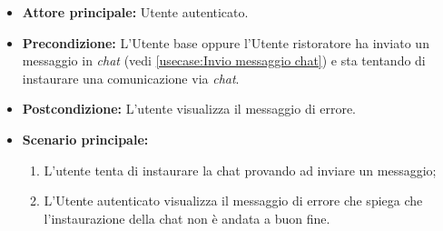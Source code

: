 \label{usecase:Visualizzazione errore instaurazione chat}
\begin{itemize}
	\item \textbf{Attore principale:} Utente autenticato.

	\item \textbf{Precondizione:}
	      L'Utente base oppure l'Utente ristoratore ha inviato un messaggio in \textit{chat} (vedi \autoref{usecase:Invio messaggio chat}) e sta tentando di instaurare una comunicazione via \textit{chat}.

	\item \textbf{Postcondizione:}
	      L'utente visualizza il messaggio di errore.

	\item \textbf{Scenario principale:}
	      \begin{enumerate}
		      \item L'utente tenta di instaurare la chat provando ad inviare un messaggio;
		      \item L'Utente autenticato visualizza il messaggio di errore che spiega che l'instaurazione della chat non è andata a buon fine.
	      \end{enumerate}
\end{itemize}
